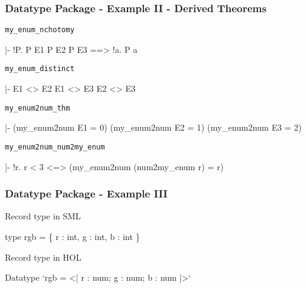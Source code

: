 \begin{frame}[fragile]
\frametitle{Datatype Package - Example II - Derived Theorems}

\begin{block}{\texttt{my\_enum\_nchotomy}}
\begin{semiverbatim}\scriptsize
|- !P. P E1 \holAnd{} P E2 \holAnd{} P E3 ==> !a. P a
\end{semiverbatim}
\end{block}

\begin{block}{\texttt{my\_enum\_distinct}}
\begin{semiverbatim}\scriptsize
|- E1 <> E2 \holAnd{} E1 <> E3 \holAnd{} E2 <> E3
\end{semiverbatim}
\end{block}

\begin{block}{\texttt{my\_enum2num\_thm}}
\begin{semiverbatim}\scriptsize
|- (my_enum2num E1 = 0) \holAnd{} (my_enum2num E2 = 1) \holAnd{} (my_enum2num E3 = 2)
\end{semiverbatim}
\end{block}

\begin{block}{\texttt{my\_enum2num\_num2my\_enum}}
\begin{semiverbatim}\scriptsize
|- !r. r < 3 <=> (my_enum2num (num2my_enum r) = r)
\end{semiverbatim}
\end{block}


\end{frame}


\begin{frame}[fragile]
\frametitle{Datatype Package - Example III}
\begin{block}{Record type in SML}
\begin{semiverbatim}\scriptsize
type rgb = \{ r : int, g : int, b : int \} 
\end{semiverbatim}
\end{block}

\begin{block}{Record type in HOL}
\begin{semiverbatim}\scriptsize
Datatype `rgb = <| r : num; g : num; b : num |>`
\end{semiverbatim}
\end{block}
\end{frame}

